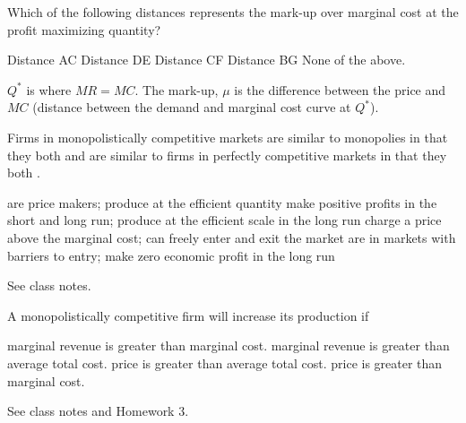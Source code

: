 \documentclass[addpoints,11pt]{exam}
\theoremstyle{definition}
\newcommand{\blank}[0]{\underline{\hspace{3cm}}}
\begin{document}
\begin{questions}
\newpage
	
	\question \label{q5} Which of the following distances represents the mark-up over marginal cost at the profit maximizing quantity?
	
	\begin{choices}
		\choice Distance AC
		\choice Distance DE
		\choice Distance CF
		\CorrectChoice Distance BG
		\choice None of the above.
	\end{choices}
	
	\begin{solution}
		$Q^*$ is where $MR=MC$. The mark-up, $\mu$ is the difference between the price and $MC$ (distance between the demand and marginal cost curve at $Q^*$).
	\end{solution}

	
	\question Firms in monopolistically competitive markets are similar to monopolies in that they both \blank and are similar to firms in perfectly competitive markets in that they both \blank.
	
	\begin{choices}
		\choice are price makers; produce at the efficient quantity
		\choice make positive profits in the short and long run; produce at the efficient scale in the long run
		\CorrectChoice charge a price above the marginal cost; can freely enter and exit the market
		\choice are in markets with barriers to entry; make zero economic profit in the long run
	\end{choices}
	
	\begin{solution}
		See class notes.
	\end{solution}
	
	\question A monopolistically competitive firm will increase its production if
	
	\begin{choices}
		\CorrectChoice marginal revenue is greater than marginal cost.
		\choice marginal revenue is greater than average total cost.
		\choice price is greater than average total cost.
		\choice price is greater than marginal cost.
	\end{choices}
	
		\begin{solution}
			See class notes and Homework 3.
		\end{solution}

	
		


\end{questions}
\end{document}

